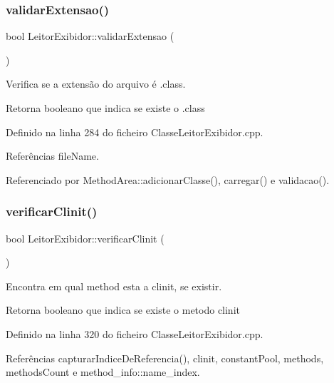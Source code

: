 \subsubsection{\texorpdfstring{validar\+Extensao()}{validarExtensao()}}
{\footnotesize\ttfamily bool Leitor\+Exibidor\+::validar\+Extensao (\begin{DoxyParamCaption}{ }\end{DoxyParamCaption})}



Verifica se a extensão do arquivo é .class. 

\begin{DoxyReturn}{Retorna}
booleano que indica se existe o .class 
\end{DoxyReturn}


Definido na linha 284 do ficheiro Classe\+Leitor\+Exibidor.\+cpp.



Referências file\+Name.



Referenciado por Method\+Area\+::adicionar\+Classe(), carregar() e validacao().

\mbox{\label{classLeitorExibidor_a8aeff3d072e77288215e5a070e958cf0}} 
\subsubsection{\texorpdfstring{verificar\+Clinit()}{verificarClinit()}}
{\footnotesize\ttfamily bool Leitor\+Exibidor\+::verificar\+Clinit (\begin{DoxyParamCaption}{ }\end{DoxyParamCaption})\hspace{0.3cm}{\ttfamily [private]}}



Encontra em qual method esta a clinit, se existir. 

\begin{DoxyReturn}{Retorna}
booleano que indica se existe o metodo clinit 
\end{DoxyReturn}


Definido na linha 320 do ficheiro Classe\+Leitor\+Exibidor.\+cpp.



Referências capturar\+Indice\+De\+Referencia(), clinit, constant\+Pool, methods, methods\+Count e method\+\_\+info\+::name\+\_\+index.



